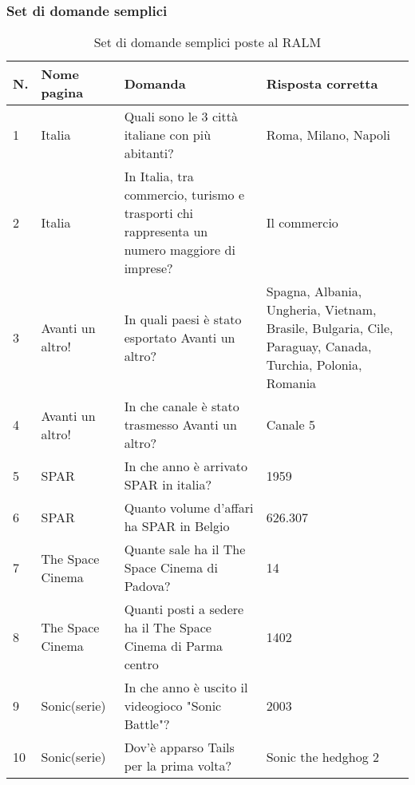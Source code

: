 \subsubsection{Set di domande semplici}
\begin{table}[H]
    \centering
    \begin{tabular}{|p{0.5cm} |p{2.5cm} |p{4cm}| p{4.5cm}|}
        \hline
        \textbf{N}. & \textbf{Nome pagina} & \textbf{Domanda} & \textbf{Risposta corretta} \\
        \hline
        1 & Italia & Quali sono le 3 città italiane con più abitanti? & Roma, Milano, Napoli \\
        \hline
        2 & Italia & In Italia, tra commercio, turismo e trasporti chi rappresenta un numero maggiore di imprese? & Il commercio \\
        \hline
        3 & Avanti un altro! & In quali paesi è stato esportato Avanti un altro? & Spagna, Albania, Ungheria, Vietnam, Brasile, Bulgaria, Cile, Paraguay, Canada, Turchia, Polonia, Romania \\
        \hline
        4 & Avanti un altro! & In che canale è stato trasmesso Avanti un altro? & Canale 5\\
        \hline
        5 & SPAR & In che anno è arrivato SPAR in italia? & 1959 \\
        \hline
        6 & SPAR & Quanto volume d'affari ha SPAR in Belgio & 626.307 \\
        \hline
        7 & The Space Cinema & Quante sale ha il The Space Cinema di Padova? & 14 \\
        \hline
        8 & The Space Cinema & Quanti posti a sedere ha il The Space Cinema di Parma centro & 1402 \\
        \hline
        9 & Sonic(serie) & In che anno è uscito il videogioco "Sonic Battle"? & 2003 \\
        \hline
        10 & Sonic(serie) & Dov'è apparso Tails per la prima volta? & Sonic the hedghog 2 \\
        \hline
    \end{tabular}
    \caption{Set di domande semplici poste al RALM}
\end{table}

